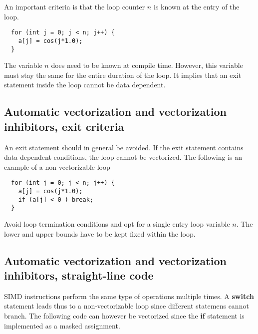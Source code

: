 An important criteria is that the loop counter $n$ is known at the entry of the loop.




\begin{verbatim}
  for (int j = 0; j < n; j++) {
    a[j] = cos(j*1.0);
  }

\end{verbatim}

The variable $n$ does need to be known at compile time. However, this variable must stay the same for the entire duration of the loop. It implies that an exit statement inside the loop cannot be data dependent.

\subsection*{Automatic vectorization and vectorization inhibitors, exit criteria}

An exit statement should in general be avoided. 
If the exit statement contains data-dependent conditions, the loop cannot be vectorized. 
The following is an example of a non-vectorizable loop





\begin{verbatim}
  for (int j = 0; j < n; j++) {
    a[j] = cos(j*1.0);
    if (a[j] < 0 ) break;
  }

\end{verbatim}

Avoid loop termination conditions and opt for a single entry loop variable $n$. The lower and upper bounds have to be kept fixed within the loop. 

\subsection*{Automatic vectorization and vectorization inhibitors, straight-line code}

SIMD instructions perform the same type of operations multiple times. 
A \textbf{switch} statement leads thus to a non-vectorizable loop since different statemens cannot branch.
The following code can however be vectorized since the \textbf{if} statement is implemented as a masked assignment.










